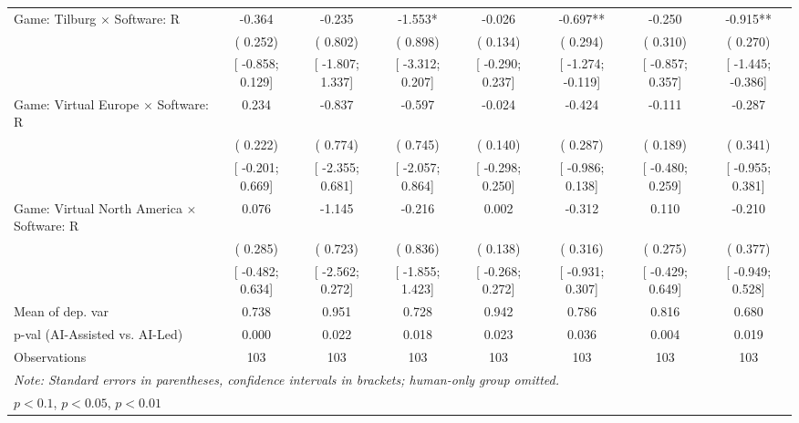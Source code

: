 \begin{tabular}{l*{7}{c}}
Game: Tilburg $\times$ Software: R &   -0.364   &   -0.235   &   -1.553*   &   -0.026   &   -0.697**   &   -0.250   &   -0.915**   \\
                    &(    0.252)   &(    0.802)   &(    0.898)   &(    0.134)   &(    0.294)   &(    0.310)   &(    0.270)   \\
                    &[   -0.858;     0.129]   &[   -1.807;     1.337]   &[   -3.312;     0.207]   &[   -0.290;     0.237]   &[   -1.274;    -0.119]   &[   -0.857;     0.357]   &[   -1.445;    -0.386]   \\
Game: Virtual Europe $\times$ Software: R &    0.234   &   -0.837   &   -0.597   &   -0.024   &   -0.424   &   -0.111   &   -0.287   \\
                    &(    0.222)   &(    0.774)   &(    0.745)   &(    0.140)   &(    0.287)   &(    0.189)   &(    0.341)   \\
                    &[   -0.201;     0.669]   &[   -2.355;     0.681]   &[   -2.057;     0.864]   &[   -0.298;     0.250]   &[   -0.986;     0.138]   &[   -0.480;     0.259]   &[   -0.955;     0.381]   \\
Game: Virtual North America $\times$ Software: R &    0.076   &   -1.145   &   -0.216   &    0.002   &   -0.312   &    0.110   &   -0.210   \\
                    &(    0.285)   &(    0.723)   &(    0.836)   &(    0.138)   &(    0.316)   &(    0.275)   &(    0.377)   \\
                    &[   -0.482;     0.634]   &[   -2.562;     0.272]   &[   -1.855;     1.423]   &[   -0.268;     0.272]   &[   -0.931;     0.307]   &[   -0.429;     0.649]   &[   -0.949;     0.528]   \\
\hline
Mean of dep. var    &    0.738   &    0.951   &    0.728   &    0.942   &    0.786   &    0.816   &    0.680   \\
p-val (AI-Assisted vs. AI-Led)&    0.000   &    0.022   &    0.018   &    0.023   &    0.036   &    0.004   &    0.019   \\
Observations        &103   &103   &103   &103   &103   &103   &103   \\
\hline\hline
\multicolumn{8}{l}{\it{Note:} Standard errors in parentheses, confidence intervals in brackets; human-only group omitted.}\\
\multicolumn{8}{l}{\sym{*} \(p<0.1\), \sym{**} \(p<0.05\), \sym{***} \(p<0.01\)}\\
\end{tabular}
